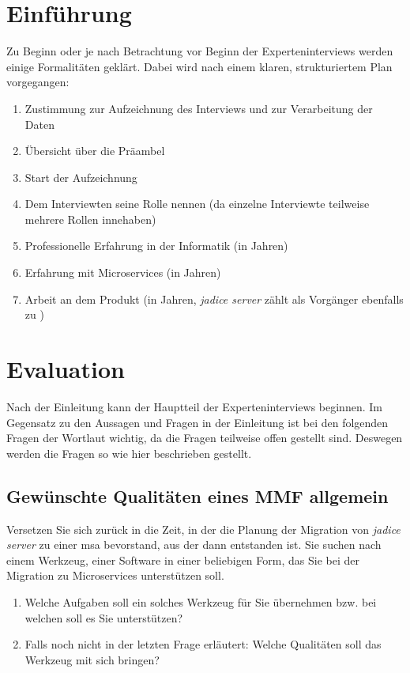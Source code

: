 \section{Einführung}

Zu Beginn oder je nach Betrachtung vor Beginn der Experteninterviews werden einige Formalitäten geklärt.
Dabei wird nach einem klaren, strukturiertem Plan vorgegangen:

\begin{enumerate}
	\item Zustimmung zur Aufzeichnung des Interviews und zur Verarbeitung der Daten
	\item Übersicht über die Präambel
	\item Start der Aufzeichnung
	\item Dem Interviewten seine Rolle nennen (da einzelne Interviewte teilweise mehrere Rollen innehaben)
	\item Professionelle Erfahrung in der Informatik (in Jahren)
	\item Erfahrung mit Microservices (in Jahren)
	\item Arbeit an dem Produkt (in Jahren, \emph{jadice server} zählt als Vorgänger ebenfalls zu \jf)
\end{enumerate}

\section{Evaluation}

Nach der Einleitung kann der Hauptteil der Experteninterviews beginnen.
Im Gegensatz zu den Aussagen und Fragen in der Einleitung ist bei den folgenden Fragen der Wortlaut wichtig, da die Fragen teilweise offen gestellt sind.
Deswegen werden die Fragen so wie hier beschrieben gestellt.

\subsection{Gewünschte Qualitäten eines MMF allgemein}

Versetzen Sie sich zurück in die Zeit, in der die Planung der Migration von \emph{jadice server} zu einer \acrlong{msa} bevorstand, aus der dann \jf entstanden ist.
Sie suchen nach einem Werkzeug, einer Software in einer beliebigen Form, das Sie bei der Migration zu Microservices unterstützen soll.

\begin{enumerate}
	\item Welche Aufgaben soll ein solches Werkzeug für Sie übernehmen bzw. bei welchen soll es Sie unterstützen?
	\item Falls noch nicht in der letzten Frage erläutert: Welche Qualitäten soll das Werkzeug mit sich bringen?
\end{enumerate}

